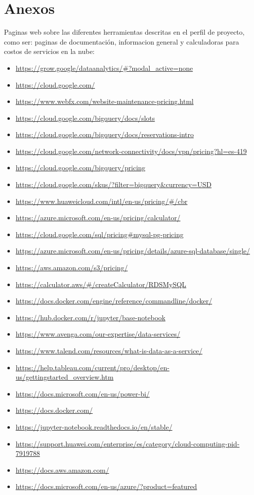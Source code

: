 \documentclass[12pt,a4paper,openright]{article}
\begin{document}
\section{Anexos}
Paginas web sobre las diferentes herramientas descritas en el perfil de proyecto, como ser: paginas de documentaci\'on, informacion general y calculadoras para costos de servicios en la nube:

\begin{itemize}
    \item \url{https://grow.google/dataanalytics/#?modal_active=none}
    \item \url{https://cloud.google.com/}
    \item \url{https://www.webfx.com/website-maintenance-pricing.html}
    \item \url{https://cloud.google.com/bigquery/docs/slots}
    \item \url{https://cloud.google.com/bigquery/docs/reservations-intro}
    \item \url{https://cloud.google.com/network-connectivity/docs/vpn/pricing?hl=es-419}
    \item \url{https://cloud.google.com/bigquery/pricing}
    \item \url{https://cloud.google.com/skus/?filter=bigquery&currency=USD}
    \item \url{https://www.huaweicloud.com/intl/en-us/pricing/#/cbr}
    \item \url{https://azure.microsoft.com/en-us/pricing/calculator/}
    \item \url{https://cloud.google.com/sql/pricing#mysql-pg-pricing}
    \item \url{https://azure.microsoft.com/en-us/pricing/details/azure-sql-database/single/}
    \item \url{https://aws.amazon.com/s3/pricing/}
    \item \url{https://calculator.aws/#/createCalculator/RDSMySQL}
    \item \url{https://docs.docker.com/engine/reference/commandline/docker/}
    \item \url{https://hub.docker.com/r/jupyter/base-notebook}
    \item \url{https://www.avenga.com/our-expertise/data-services/}
    \item \url{https://www.talend.com/resources/what-is-data-as-a-service/}
    \item \url{https://help.tableau.com/current/pro/desktop/en-us/gettingstarted_overview.htm}
    \item \url{https://docs.microsoft.com/en-us/power-bi/}
    \item \url{https://docs.docker.com/}
    \item \url{https://jupyter-notebook.readthedocs.io/en/stable/}
    \item \url{https://support.huawei.com/enterprise/es/category/cloud-computing-pid-7919788}
    \item \url{https://docs.aws.amazon.com/}
    \item \url{https://docs.microsoft.com/en-us/azure/?product=featured}
\end{itemize}
\end{document}
